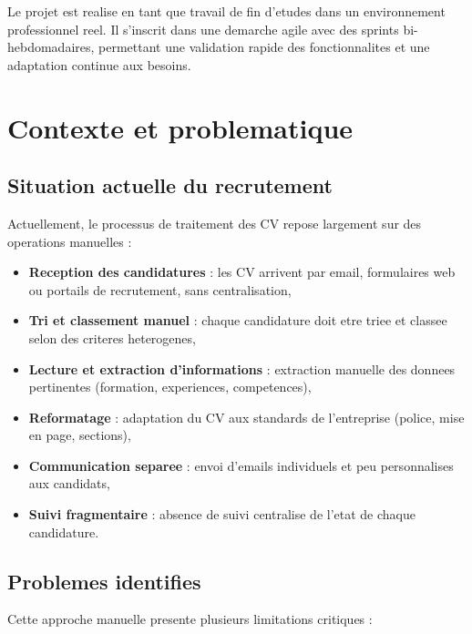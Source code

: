 Le projet est realise en tant que travail de fin d'etudes dans un environnement professionnel reel. Il s'inscrit dans une demarche agile avec des sprints bi-hebdomadaires, permettant une validation rapide des fonctionnalites et une adaptation continue aux besoins.

\section{Contexte et problematique}

\subsection{Situation actuelle du recrutement}

Actuellement, le processus de traitement des CV repose largement sur des operations manuelles :

\begin{itemize}
    \item \textbf{Reception des candidatures} : les CV arrivent par email, formulaires web ou portails de recrutement, sans centralisation,
    
    \item \textbf{Tri et classement manuel} : chaque candidature doit etre triee et classee selon des criteres heterogenes,
    
    \item \textbf{Lecture et extraction d'informations} : extraction manuelle des donnees pertinentes (formation, experiences, competences),
    
    \item \textbf{Reformatage} : adaptation du CV aux standards de l'entreprise (police, mise en page, sections),
    
    \item \textbf{Communication separee} : envoi d'emails individuels et peu personnalises aux candidats,
    
    \item \textbf{Suivi fragmentaire} : absence de suivi centralise de l'etat de chaque candidature.
\end{itemize}

\subsection{Problemes identifies}

Cette approche manuelle presente plusieurs limitations critiques :

